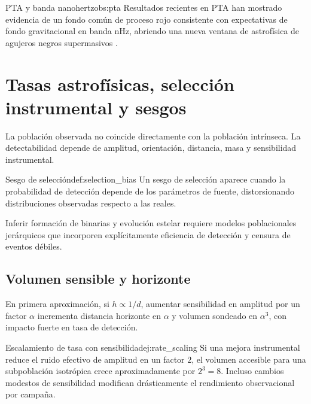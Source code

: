 \begin{observacion}{PTA y banda nanohertz}{obs:pta}
Resultados recientes en PTA han mostrado evidencia de un fondo común de proceso rojo consistente con expectativas de fondo gravitacional en banda nHz, abriendo una nueva ventana de astrofísica de agujeros negros supermasivos \cite{NANOGrav2023}.
\end{observacion}

\section{Tasas astrofísicas, selección instrumental y sesgos}
\label{sec:tasas_seleccion}

La población observada no coincide directamente con la población intrínseca. La detectabilidad depende de amplitud, orientación, distancia, masa y sensibilidad instrumental.

\begin{definicion}{Sesgo de selección}{def:selection_bias}
Un sesgo de selección aparece cuando la probabilidad de detección depende de los parámetros de fuente, distorsionando distribuciones observadas respecto a las reales.
\end{definicion}

\begin{importante}
Inferir formación de binarias y evolución estelar requiere modelos poblacionales jerárquicos que incorporen explícitamente eficiencia de detección y censura de eventos débiles.
\end{importante}

\subsection{Volumen sensible y horizonte}

En primera aproximación, si $h\propto1/d$, aumentar sensibilidad en amplitud por un factor $\alpha$ incrementa distancia horizonte en $\alpha$ y volumen sondeado en $\alpha^3$, con impacto fuerte en tasa de detección.

\begin{ejemplo}{Escalamiento de tasa con sensibilidad}{ej:rate_scaling}
Si una mejora instrumental reduce el ruido efectivo de amplitud en un factor $2$, el volumen accesible para una subpoblación isotrópica crece aproximadamente por $2^3=8$. Incluso cambios modestos de sensibilidad modifican drásticamente el rendimiento observacional por campaña.
\end{ejemplo}


